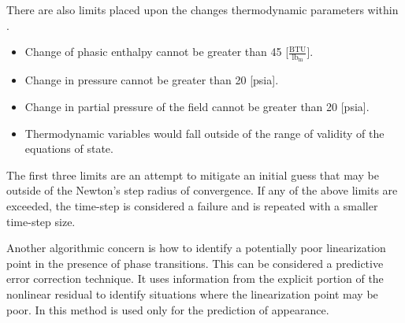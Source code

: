 There are also limits placed upon the changes thermodynamic parameters within \cobra{}.
\begin{itemize}
\item{Change of phasic enthalpy cannot be greater than 45 [$\frac{\text{BTU}}{\text{lb}_{\text{m}}}$].}
\item{Change in pressure cannot be greater than 20 [psia].}
\item{Change in partial pressure of the \ncg field cannot be greater than 20 [psia].}
\item{Thermodynamic variables would fall outside of the range of validity of the equations of state.}
\end{itemize}
The first three limits are an attempt to mitigate an initial guess that may be outside of the Newton's step radius of convergence.
If any of the above limits are exceeded, the time-step is considered a failure and is repeated with a smaller time-step size.

Another algorithmic concern is how to identify a potentially poor linearization point in the presence of phase transitions. 
This can be considered a predictive error correction technique.
It uses information from the explicit portion of the nonlinear residual to identify situations where the linearization point may be poor.
In \cobra{} this method is used only for the prediction of \ncg{} appearance.


